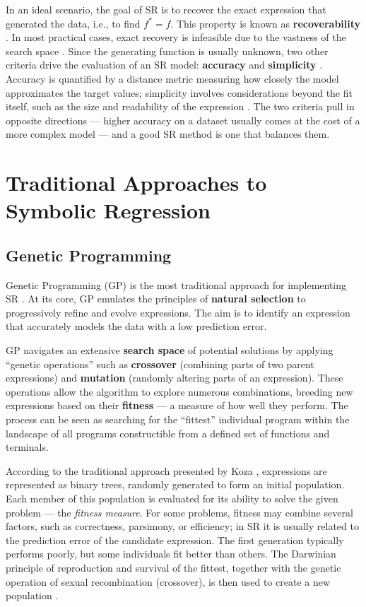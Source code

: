 In an ideal scenario, the goal of SR is to recover the exact expression that generated the data, i.e., to find \(f^* = f\). This property is known as \textbf{recoverability} \cite{guimera2020bayesian, tohme2022gsr}. In most practical cases, exact recovery is infeasible due to the vastness of the search space \cite{petersen2020deep}. Since the generating function is usually unknown, two other criteria drive the evaluation of an SR model: \textbf{accuracy} and \textbf{simplicity} \cite{guimera2020bayesian, lacava2021contemporary}. Accuracy is quantified by a distance metric measuring how closely the model approximates the target values; simplicity involves considerations beyond the fit itself, such as the size and readability of the expression \cite{lacava2021contemporary}. The two criteria pull in opposite directions --- higher accuracy on a dataset usually comes at the cost of a more complex model --- and a good SR method is one that balances them.

\section{Traditional Approaches to Symbolic Regression}

\subsection{Genetic Programming}

Genetic Programming (GP) is the most traditional approach for implementing SR \cite{lacava2021contemporary}. At its core, GP emulates the principles of \textbf{natural selection} to progressively refine and evolve expressions. The aim is to identify an expression that accurately models the data with a low prediction error.

GP navigates an extensive \textbf{search space} of potential solutions by applying ``genetic operations'' such as \textbf{crossover} (combining parts of two parent expressions) and \textbf{mutation} (randomly altering parts of an expression). These operations allow the algorithm to explore numerous combinations, breeding new expressions based on their \textbf{fitness} --- a measure of how well they perform. The process can be seen as searching for the ``fittest'' individual program within the landscape of all programs constructible from a defined set of functions and terminals.

According to the traditional approach presented by Koza \cite{Koza1992}, expressions are represented as binary trees, randomly generated to form an initial population. Each member of this population is evaluated for its ability to solve the given problem --- the \textit{fitness measure}. For some problems, fitness may combine several factors, such as correctness, parsimony, or efficiency; in SR it is usually related to the prediction error of the candidate expression. The first generation typically performs poorly, but some individuals fit better than others. The Darwinian principle of reproduction and survival of the fittest, together with the genetic operation of sexual recombination (crossover), is then used to create a new population \cite{Koza1992}.

